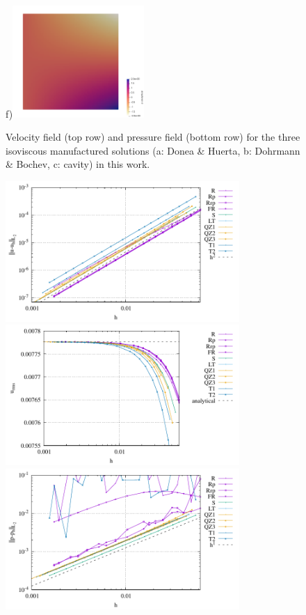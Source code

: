 \documentclass[a4paper,12pt]{article}
\begin{document}
\begin{figure}[t]
f)\includegraphics[width=5cm]{../images/fields/press_cavity}
\caption{Velocity field (top row) and pressure field (bottom 
row) for the three isoviscous manufactured solutions (a: Donea \& Huerta, 
b: Dohrmann \& Bochev, c: cavity) in this work. \label{fig:dh1}}
\end{figure}

\begin{figure}
\centering
\includegraphics[width=8.9cm]{../results/errors_u_exp1}
\includegraphics[width=8.9cm]{../results/vrms_exp1} \\
\includegraphics[width=8.9cm]{../results/errors_p_exp1}

\end{figure}
\end{document}
